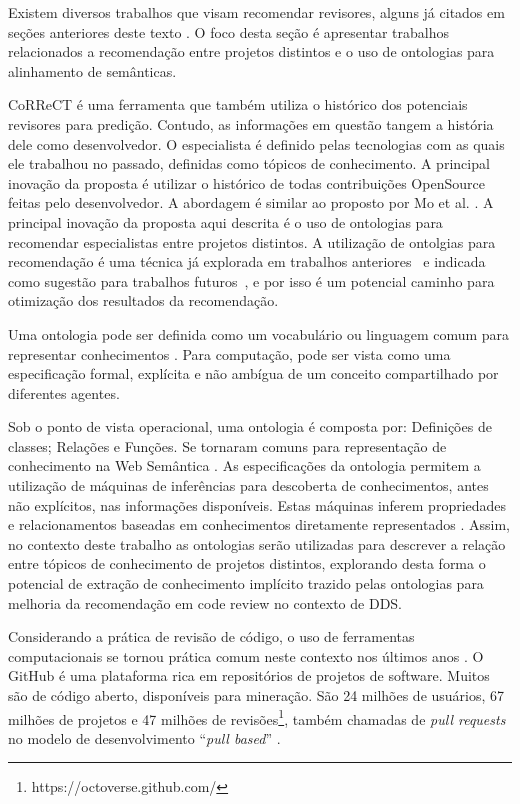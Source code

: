 \documentclass[sigconf]{acmart}
\begin{document}
Existem diversos trabalhos que visam recomendar revisores, alguns já citados em seções anteriores deste texto \cite{yu2014,yu2014-2,Xia2015261,jiang2017,fu2017,xia2017,yang2016}. O foco desta seção é apresentar trabalhos relacionados a recomendação entre projetos distintos e o uso de ontologias para alinhamento de semânticas.

CoRReCT \cite{rahman2016} é uma ferramenta que também utiliza o histórico dos potenciais revisores para predição. Contudo, as informações em questão tangem a história dele como desenvolvedor. O especialista é definido pelas tecnologias com as quais ele trabalhou no passado, definidas como tópicos de conhecimento. A principal inovação da proposta é utilizar o histórico de todas contribuições OpenSource feitas pelo desenvolvedor. A abordagem é similar ao proposto por Mo et al. \cite{mo2015}. A principal inovação da proposta aqui descrita é o uso de ontologias para recomendar especialistas entre projetos distintos. A utilização de ontolgias para recomendação é uma técnica já explorada em trabalhos anteriores~\cite{middleton2001,middleton2004} e indicada como sugestão para trabalhos futuros~\cite{adomavicius2005}, e por isso é um potencial caminho para otimização dos resultados da recomendação.

Uma ontologia pode ser definida como um vocabulário ou linguagem comum para representar conhecimentos \cite{guarino1998}. Para computação, pode ser vista como uma especificação formal, explícita e não ambígua de um conceito compartilhado por diferentes agentes.

Sob o ponto de vista operacional, uma ontologia é composta por: Definições de classes; Relações e Funções. Se tornaram comuns para representação de conhecimento na Web Semântica \cite{berners2001}. As especificações da ontologia permitem a utilização de máquinas de inferências para descoberta de conhecimentos, antes não explícitos, nas informações disponíveis. Estas máquinas inferem propriedades e relacionamentos baseadas em conhecimentos diretamente representados \cite{berners2001}. Assim, no contexto deste trabalho as ontologias serão utilizadas para descrever a relação entre tópicos de conhecimento de projetos distintos, explorando desta forma o potencial de extração de conhecimento implícito trazido pelas ontologias para melhoria da recomendação em code review no contexto de DDS.

Considerando a prática de revisão de código, o uso de ferramentas computacionais se tornou prática comum neste contexto nos últimos anos \cite{Bacchelli2013}. O GitHub é uma plataforma rica em repositórios de projetos de software. Muitos são de código aberto, disponíveis para mineração. São 24 milhões de usuários, 67 milhões de projetos e 47 milhões de revisões\footnote{https://octoverse.github.com/}, também chamadas de \textit{pull requests} no modelo de desenvolvimento ``\textit{pull based}'' \cite{gousios2014}.
\end{document}
